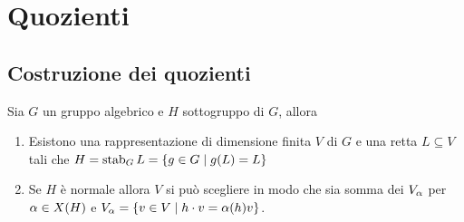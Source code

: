 \chapter{Quozienti}
\section{Costruzione dei quozienti}
\begin{lemma}\label{LmSottogruppoEStabilizzatoreDiUnaRettaInQualcheRappresentazione}
Sia $G$ un gruppo algebrico e $H$ sottogruppo di $G$, allora
\begin{enumerate}
    \item Esistono una rappresentazione di dimensione finita $V$ di $G$ e una retta $L\subseteq V$ tali che $H=\operatorname{stab}_G L=\left\{{g\in G\mid g(L)=L}\right\}$
    \item Se $H$ \`e normale allora $V$ si pu\`o scegliere in modo che sia somma dei $V_\alpha$ per $\alpha\in X(H)$ e $V_\alpha=\left\{{v\in V\mid h\cdot v=\alpha(h)v}\right\}$.
\end{enumerate}
\end{lemma}
